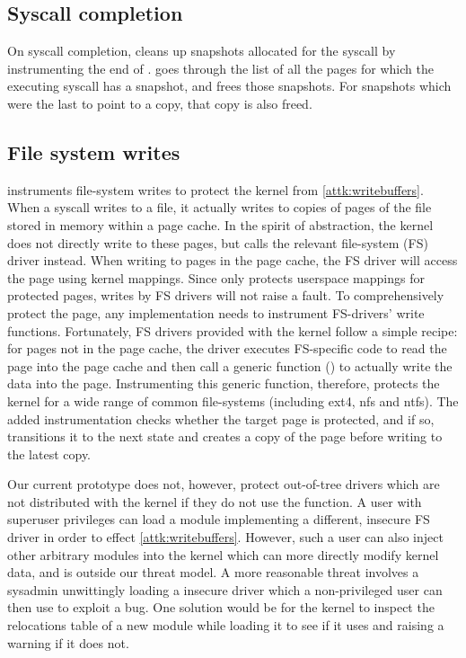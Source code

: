 \documentclass[letterpaper,twocolumn,10pt, anonymous]{article}
\begin{document}
\subsection{Syscall completion}
On syscall completion, \tiktok cleans up snapshots allocated for 
the syscall by instrumenting the end of .
\tiktok goes through the list of all the pages for which the 
executing syscall has a snapshot, and frees those snapshots.
For snapshots which were the last to point to a copy, that 
copy is also freed.

\subsection{File system writes}

\tiktok instruments file-system writes to protect the kernel
from \autoref{attk:writebuffers}.
When a  syscall writes to a file, it actually
writes to copies of pages of the file stored in memory within 
a page cache.
In the spirit of abstraction, the kernel does not directly write to 
these pages, but calls the relevant file-system (FS) driver instead.
When writing to pages in the page cache, the FS driver will access the 
page using kernel mappings.
Since \tiktok only protects userspace mappings for protected pages, 
writes by FS drivers will not raise a fault.
To comprehensively protect the page, any implementation needs to 
instrument FS-drivers' write functions.
Fortunately, FS drivers provided with the kernel follow a simple 
recipe: for pages not in the page cache, the driver executes 
FS-specific code to read the page into the page cache and then 
call a generic function () to actually 
write the data into the page.
Instrumenting this generic function, therefore, protects the kernel
for a wide range of common file-systems (including ext4, nfs and 
ntfs). \footnotemark
The added instrumentation checks whether the target page is 
protected, and if so, transitions it to the next state and 
creates a copy of the page before writing to the latest copy.

Our current prototype does not, however, protect out-of-tree drivers
which are not distributed with the kernel if they do not use the 
 function.
A user with superuser privileges can load a module implementing a 
different, insecure FS driver in order to effect \autoref{attk:writebuffers}.
However, such a user can also inject other arbitrary modules into 
the kernel which can more directly modify kernel data, and is 
outside our threat model.
A more reasonable threat involves a sysadmin unwittingly loading a 
insecure driver which a non-privileged user can then use to 
exploit a \tocttou bug. 
One solution would be for the kernel to inspect the relocations table of 
a new module while loading it to see if it uses 
and raising a warning if it does not.
\end{document}
